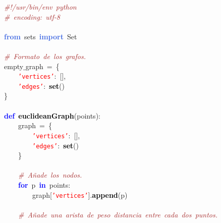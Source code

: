 \noindent
\mbox{}\textit{\textcolor{Brown}{\#!/usr/bin/env\ python}} \\
\mbox{}\textit{\textcolor{Brown}{\#\ encoding:\ utf-8}} \\
\mbox{} \\
\mbox{}\textbf{\textcolor{RoyalBlue}{from}}\ sets\ \textbf{\textcolor{RoyalBlue}{import}}\ Set \\
\mbox{} \\
\mbox{}\textit{\textcolor{Brown}{\#\ Formato\ de\ los\ grafos.}} \\
\mbox{}empty$\_$graph\ \textcolor{BrickRed}{=}\ \textcolor{BrickRed}{\{} \\
\mbox{}\ \ \ \ \texttt{\textcolor{Red}{'vertices'}}\textcolor{BrickRed}{:}\ \textcolor{BrickRed}{[],} \\
\mbox{}\ \ \ \ \texttt{\textcolor{Red}{'edges'}}\textcolor{BrickRed}{:}\ \textbf{\textcolor{Black}{set}}\textcolor{BrickRed}{()} \\
\mbox{}\textcolor{BrickRed}{\}} \\
\mbox{} \\
\mbox{}\textbf{\textcolor{Blue}{def}}\ \textbf{\textcolor{Black}{euclideanGraph}}\textcolor{BrickRed}{(}points\textcolor{BrickRed}{):} \\
\mbox{}\ \ \ \ graph\ \textcolor{BrickRed}{=}\ \textcolor{BrickRed}{\{} \\
\mbox{}\ \ \ \ \ \ \ \ \texttt{\textcolor{Red}{'vertices'}}\textcolor{BrickRed}{:}\ \textcolor{BrickRed}{[],} \\
\mbox{}\ \ \ \ \ \ \ \ \texttt{\textcolor{Red}{'edges'}}\textcolor{BrickRed}{:}\ \textbf{\textcolor{Black}{set}}\textcolor{BrickRed}{()} \\
\mbox{}\ \ \ \ \textcolor{BrickRed}{\}} \\
\mbox{} \\
\mbox{}\ \ \ \ \textit{\textcolor{Brown}{\#\ Añade\ los\ nodos.}} \\
\mbox{}\ \ \ \ \textbf{\textcolor{Blue}{for}}\ p\ \textbf{\textcolor{Blue}{in}}\ points\textcolor{BrickRed}{:} \\
\mbox{}\ \ \ \ \ \ \ \ graph\textcolor{BrickRed}{[}\texttt{\textcolor{Red}{'vertices'}}\textcolor{BrickRed}{].}\textbf{\textcolor{Black}{append}}\textcolor{BrickRed}{(}p\textcolor{BrickRed}{)} \\
\mbox{}\ \ \ \  \\
\mbox{}\ \ \ \ \textit{\textcolor{Brown}{\#\ Añade\ una\ arista\ de\ peso\ distancia\ entre\ cada\ dos\ puntos.}} \\
